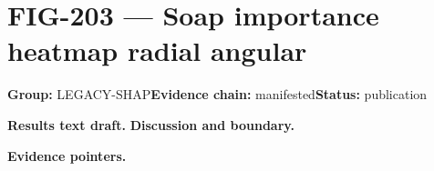 \clearpage
\section{FIG-203 --- Soap importance heatmap radial angular}
\label{figpage:fig-203}
\textbf{Group:} LEGACY-SHAP\quad \textbf{Evidence chain:} manifested\quad \textbf{Status:} publication

\textbf{Results text draft.} 
\textbf{Discussion and boundary.} 


\textbf{Evidence pointers.}



\vfill
